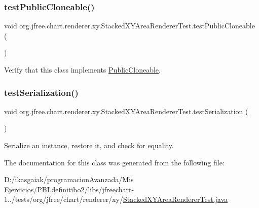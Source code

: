 \subsubsection{\texorpdfstring{test\+Public\+Cloneable()}{testPublicCloneable()}}
{\footnotesize\ttfamily void org.\+jfree.\+chart.\+renderer.\+xy.\+Stacked\+X\+Y\+Area\+Renderer\+Test.\+test\+Public\+Cloneable (\begin{DoxyParamCaption}{ }\end{DoxyParamCaption})}

Verify that this class implements \mbox{\hyperlink{}{Public\+Cloneable}}. \mbox{\label{classorg_1_1jfree_1_1chart_1_1renderer_1_1xy_1_1_stacked_x_y_area_renderer_test_a558b3ae8702d044f57c34fc22b9a4264}} 
\subsubsection{\texorpdfstring{test\+Serialization()}{testSerialization()}}
{\footnotesize\ttfamily void org.\+jfree.\+chart.\+renderer.\+xy.\+Stacked\+X\+Y\+Area\+Renderer\+Test.\+test\+Serialization (\begin{DoxyParamCaption}{ }\end{DoxyParamCaption})}

Serialize an instance, restore it, and check for equality. 

The documentation for this class was generated from the following file\+:\begin{DoxyCompactItemize}
\item 
D\+:/ikasgaiak/programacion\+Avanzada/\+Mis Ejercicios/\+P\+B\+Ldefinitibo2/libs/jfreechart-\/1../tests/org/jfree/chart/renderer/xy/\mbox{\hyperlink{_stacked_x_y_area_renderer_test_8java}{Stacked\+X\+Y\+Area\+Renderer\+Test.\+java}}\end{DoxyCompactItemize}
